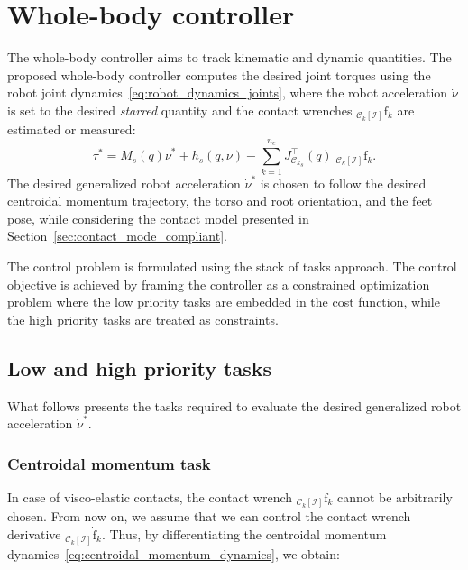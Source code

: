 \section{Whole-body controller \label{sec:controller_tsid_compliant}}

The whole-body controller aims to track kinematic and dynamic quantities.
The proposed whole-body controller computes the desired joint torques using the robot joint dynamics~\eqref{eq:robot_dynamics_joints}, where the robot acceleration $\dot{\nu}$ is set to the desired \emph{starred} quantity and the contact wrenches ${}_{\mathcal{C}_k[\mathcal{I}]}\mathrm{f}_k$ are estimated or measured:
\begin{equation}
    \label{eq:forward_dynamics_compliant}
    \tau^* = M_{s}(q) \dot{\nu}^* + h_{s} (q, \nu) - \sum_{k = 1}^{n_c} J^\top_{{\mathcal{C}_k}_s}(q)  \; {}_{\mathcal{C}_k[\mathcal{I}]}\mathrm{f}_k.
\end{equation}
The desired generalized robot acceleration $\dot{\nu}^{*}$ is chosen to follow the desired centroidal momentum trajectory, the torso and root orientation, and the feet pose, while considering the contact model presented in Section~\ref{sec:contact_mode_compliant}.
\par 
The control problem is formulated using the stack of tasks approach. The control objective is achieved by framing the controller as a constrained optimization problem where the low priority tasks are embedded in the cost function, while the high priority tasks are treated as constraints.

\subsection{Low and high priority tasks \label{sec:tsid_compliant_tasks}}
What follows presents the tasks required to evaluate the desired generalized robot acceleration $\dot{\nu}^{*}$. 
\subsubsection{Centroidal momentum task}
In case of visco-elastic contacts, the contact wrench ${}_{\mathcal{C}_k[\mathcal{I}]}\mathrm{f}_k$ cannot be arbitrarily chosen. From now on, we assume that we can control the contact wrench derivative ${}_{\mathcal{C}_k[\mathcal{I}]}\dot{\mathrm{f}}_k$. Thus, by differentiating the centroidal momentum dynamics~\eqref{eq:centroidal_momentum_dynamics}, we obtain:


